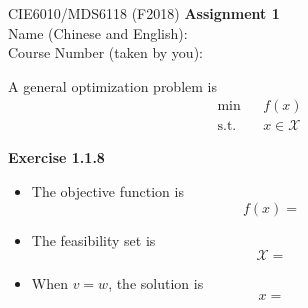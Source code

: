 \documentclass[11pt]{article}
\newcommand{\cX}{\mathcal{X}}
\renewcommand{\st}{\mathrm{s.t.}}
\begin{document}
\begin{center}
{\large CIE6010/MDS6118 (F2018)}
{\Large\bf Assignment 1}\\[.2in]
Name (Chinese and English): \underline{\hspace{2in}}\\[.1in]
Course Number (taken by you): \underline{\hspace{2in}}
\end{center}
\medskip


A general optimization problem is
\begin{eqnarray*}
\min && f(x) \\
\st && x \in \cX
\end{eqnarray*}

{\bf Exercise 1.1.8}
\begin{itemize}
\item The objective function is
\[
f(x) = 
\]

\item The feasibility set is
\[
\cX = 
\]

\item When $v=w$, the solution is
\[
x = 
\]
\end{itemize}
\end{document}
